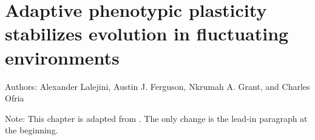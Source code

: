 \chapter{Adaptive phenotypic plasticity
stabilizes evolution in fluctuating environments}
\label{chap:consequences_of_plasticity}

\noindent
Authors: Alexander Lalejini, Austin J. Ferguson, Nkrumah A. Grant, and Charles Ofria

\noindent
Note: This chapter is adapted from \citep{lalejiniAdaptivePhenotypicPlasticity2021}. 
The only change is the lead-in paragraph at the beginning. 



\newcommand{\evolutionaryChangeRateReplicates}{100}
\newcommand{\evolutionaryChangeRatePlasticReps}{42}

\newcommand{\novelTraitsReplicates}{100}
\newcommand{\novelTraitsReward}{10\%}
\newcommand{\novelTraitsPlasticReps}{42}

\newcommand{\deleteriousHitchhikingReplicates}{100}
\newcommand{\deleteriousHitchhikingPlasticReps}{43}
\newcommand{\instPoisonMagnitude}{10\%}

\newcommand{\SweepsMetricName}{
Coalescence event count
}
\newcommand{\SweepsMetricDesc}{
Number of coalescence events that have occurred, which indicates the frequency of selective sweeps in the population.
}

\newcommand{\MutationCountMetricName}{
Mutation count
}
\newcommand{\MutationCountMetricDesc}{
Sum of all mutations that have occurred along a lineage.
}

\newcommand{\PhenotypicVolatilityMetricName}{
Phenotypic volatility
}
\newcommand{\PhenotypicVolatilityMetricDesc}{
Number of instances where parent and offspring phenotypic profiles do not match along a lineage.
}

\newcommand{\MutationalStabilityMetricName}{
Mutational robustness
}
\newcommand{\MutationalStabilityMetricDesc}{
Proportion of mutations (from the set of all possible one-step mutations) that do not change the phenotypic profile of a focal genotype. We also measured \textit{realized mutational robustness}, which is the proportion of mutated offspring along a lineage whose phenotypic profile matches that of their parent.
}


